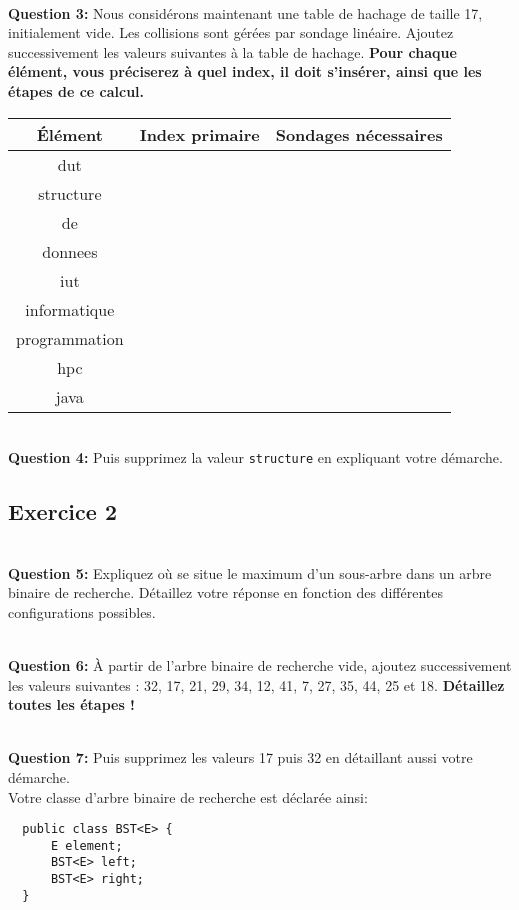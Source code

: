 \documentclass[iutinfo,10pt]{ustl-tdtp}
\begin{document}
~\\ \textbf{Question 3:}  Nous considérons maintenant une table de hachage de taille 17, initialement vide. Les collisions sont gérées par sondage linéaire. Ajoutez successivement les valeurs suivantes à la table de hachage. \textbf{Pour chaque élément, vous préciserez à
  quel index, il doit s'insérer, ainsi que les étapes de ce calcul.}

\begin{center}
\begin{tabular}{|c|c|c|}
\hline
Élément & Index primaire & Sondages nécessaires\\
\hline 
dut & & \\
structure & &  \\
de & &  \\
donnees & &  \\
iut & &  \\
informatique & &  \\
programmation & &  \\
hpc & & \\
java & &  \\
\hline
\end{tabular}
\end{center}

~\\ \textbf{Question 4:} Puis supprimez la valeur \texttt{structure} en expliquant votre démarche.

\vspace{2cm}
\subsection*{Exercice 2}

~\\ \textbf{Question 5:} Expliquez où se situe le maximum d'un sous-arbre dans un arbre binaire de recherche. Détaillez votre réponse en fonction des différentes configurations possibles.

~\\ \textbf{Question 6:} À partir de l'arbre binaire de recherche vide, ajoutez successivement les valeurs suivantes : 32, 17, 21, 29, 34, 12, 41, 7, 27, 35, 44, 25 et 18. \textbf{Détaillez toutes les étapes !}

~\\ \textbf{Question 7:} Puis supprimez les valeurs 17 puis 32 en détaillant aussi votre démarche.\\

\newpage
Votre classe d'arbre binaire de recherche est déclarée ainsi:
\begin{verbatim}
  public class BST<E> {
      E element;
      BST<E> left;
      BST<E> right;
  }
\end{verbatim}
\end{document}
